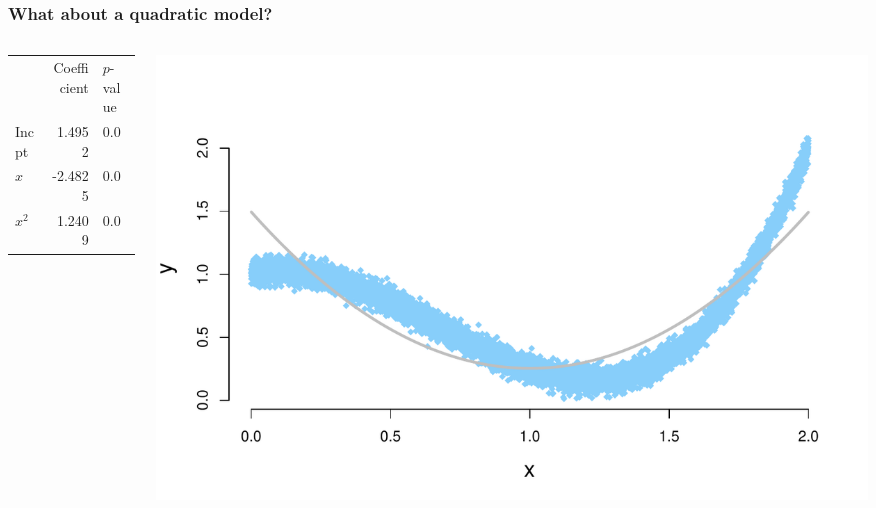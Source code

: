\documentclass[aspectratio=169]{beamer}
\theoremstyle{principle}
\begin{document}
\begin{frame}
\frametitle{What about a \textbf{quadratic} model?}

\begin{columns}
\begin{column}{0.3\textwidth}

\begin{center}
\begin{tabular}{ lrl } 
\hline
\hline
 & Coefficient & $p$-value\\ 
Incpt & 1.4952 & 0.0\\ 
$x$ & -2.4825 &0.0\\ 
$x^2$ & 1.2409 &0.0\\ 
\hline
\hline
\end{tabular}
\end{center}

\end{column}
\begin{column}{0.7\textwidth}

\begin{center}
\includegraphics[scale=0.5]{crazy_curve_x2.pdf}
\end{center}

\end{column}
\end{columns}

\end{frame}
\end{document}
